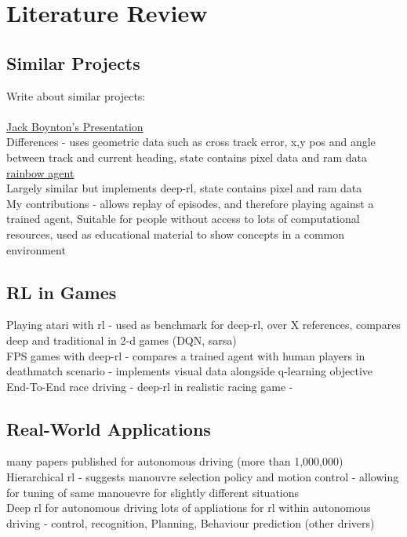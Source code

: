 
\chapter{Literature Review}
\section{Similar Projects}
Write about similar projects:
\\ \cite{BenJMiddleton}
\\ \href{https://github.com/JackWBoynton/mariokart-rl}{Jack Boynton's Presentation}
\\ Differences - uses geometric data such as cross track error, x,y pos and angle between track and current heading, state contains pixel data and ram data\\
\href{https://github.com/benjaminjmiddleton/mkw_ai_env/blob/main/README.md}{rainbow agent}
\\ Largely similar but implements deep-rl, state contains pixel and ram data
\\ My contributions - allows replay of episodes, and therefore playing against a trained agent, 
Suitable for people without access to lots of computational resources, used as educational material to show concepts in a common environment

\section{RL in Games}

\cite{mnih2013playing}Playing atari with rl - used as benchmark for deep-rl, over X references, compares deep and traditional in 2-d games (DQN, sarsa)\\
FPS games with deep-rl - compares a trained agent with human players in deathmatch scenario - implements visual data alongside q-learning objective\cite{lample2017playing}
\\End-To-End race driving - deep-rl in realistic racing game\cite{8460934} -
\section{Real-World Applications}
many papers published for autonomous driving (more than 1,000,000) 
\\Hierarchical rl - suggests manouvre selection policy and motion control - allowing for tuning of same manouevre for slightly different situations\cite{duan2020hierarchical}
\\Deep rl for autonomous driving \cite{kiran2021deep} lots of appliations for rl within autonomous driving - control, recognition, Planning, Behaviour prediction (other drivers)
